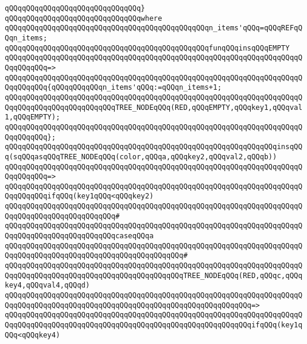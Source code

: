 \verb|qQQqqQQqqQQqqQQqqQQqqQQqqQQqqQQq}|\newline
\verb|qQQqqQQqqQQqqQQqqQQqqQQqqQQqqQQqwhere|\newline
\verb|qQQqqQQqqQQqqQQqqQQqqQQqqQQqqQQqqQQqqQQqqQQqqQQqn_items'qQQq=qQQqREFqQQqn_items;|\newline
\newline
\verb|qQQqqQQqqQQqqQQqqQQqqQQqqQQqqQQqqQQqqQQqqQQqqQQqfunqQQqinsqQQqEMPTY|\newline
\verb|qQQqqQQqqQQqqQQqqQQqqQQqqQQqqQQqqQQqqQQqqQQqqQQqqQQqqQQqqQQqqQQqqQQqqQQqqQQqqQQq=>|\newline
\verb|qQQqqQQqqQQqqQQqqQQqqQQqqQQqqQQqqQQqqQQqqQQqqQQqqQQqqQQqqQQqqQQqqQQqqQQqqQQqqQQq{qQQqqQQqqQQqn_items'qQQq:=qQQqn_items+1;|\newline
\verb|qQQqqQQqqQQqqQQqqQQqqQQqqQQqqQQqqQQqqQQqqQQqqQQqqQQqqQQqqQQqqQQqqQQqqQQqqQQqqQQqqQQqqQQqqQQqqQQqTREE_NODEqQQq(RED,qQQqEMPTY,qQQqkey1,qQQqval1,qQQqEMPTY);|\newline
\verb|qQQqqQQqqQQqqQQqqQQqqQQqqQQqqQQqqQQqqQQqqQQqqQQqqQQqqQQqqQQqqQQqqQQqqQQqqQQqqQQq};|\newline
\newline
\verb|qQQqqQQqqQQqqQQqqQQqqQQqqQQqqQQqqQQqqQQqqQQqqQQqqQQqqQQqqQQqqQQqinsqQQq(sqQQqasqQQqTREE_NODEqQQq(color,qQQqa,qQQqkey2,qQQqval2,qQQqb))|\newline
\verb|qQQqqQQqqQQqqQQqqQQqqQQqqQQqqQQqqQQqqQQqqQQqqQQqqQQqqQQqqQQqqQQqqQQqqQQqqQQqqQQq=>|\newline
\verb|qQQqqQQqqQQqqQQqqQQqqQQqqQQqqQQqqQQqqQQqqQQqqQQqqQQqqQQqqQQqqQQqqQQqqQQqqQQqqQQqifqQQq(key1qQQq<qQQqkey2)|\newline
\verb|qQQqqQQqqQQqqQQqqQQqqQQqqQQqqQQqqQQqqQQqqQQqqQQqqQQqqQQqqQQqqQQqqQQqqQQqqQQqqQQqqQQqqQQqqQQqqQQq#|\newline
\verb|qQQqqQQqqQQqqQQqqQQqqQQqqQQqqQQqqQQqqQQqqQQqqQQqqQQqqQQqqQQqqQQqqQQqqQQqqQQqqQQqqQQqqQQqqQQqqQQqcaseqQQqa|\newline
\verb|qQQqqQQqqQQqqQQqqQQqqQQqqQQqqQQqqQQqqQQqqQQqqQQqqQQqqQQqqQQqqQQqqQQqqQQqqQQqqQQqqQQqqQQqqQQqqQQqqQQqqQQqqQQqqQQq#|\newline
\verb|qQQqqQQqqQQqqQQqqQQqqQQqqQQqqQQqqQQqqQQqqQQqqQQqqQQqqQQqqQQqqQQqqQQqqQQqqQQqqQQqqQQqqQQqqQQqqQQqqQQqqQQqqQQqqQQqTREE_NODEqQQq(RED,qQQqc,qQQqkey4,qQQqval4,qQQqd)|\newline
\verb|qQQqqQQqqQQqqQQqqQQqqQQqqQQqqQQqqQQqqQQqqQQqqQQqqQQqqQQqqQQqqQQqqQQqqQQqqQQqqQQqqQQqqQQqqQQqqQQqqQQqqQQqqQQqqQQqqQQqqQQqqQQqqQQq=>|\newline
\verb|qQQqqQQqqQQqqQQqqQQqqQQqqQQqqQQqqQQqqQQqqQQqqQQqqQQqqQQqqQQqqQQqqQQqqQQqqQQqqQQqqQQqqQQqqQQqqQQqqQQqqQQqqQQqqQQqqQQqqQQqqQQqqQQqifqQQq(key1qQQq<qQQqkey4)|\newline
